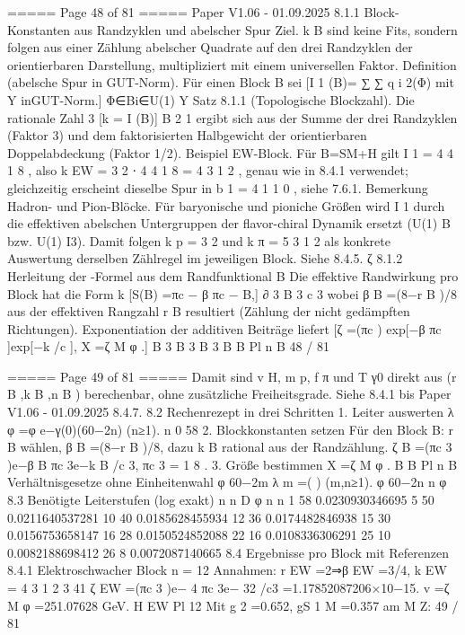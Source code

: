 \begin{MyVerbatim}
{===== Page 48 of 81 =====
Paper V1.06 - 01.09.2025
8.1.1 Block-Konstanten aus Randzyklen und abelscher Spur
Ziel. k B sind keine Fits, sondern folgen aus einer Zählung abelscher Quadrate auf den drei Randzyklen der
orientierbaren Darstellung, multipliziert mit einem universellen Faktor.
Definition (abelsche Spur in GUT-Norm). Für einen Block B sei
[I
1
(B)= ∑ ∑ q
i
2(Φ) mit Y inGUT-Norm.]
Φ∈Bi∈U(1)
Y
Satz 8.1.1 (Topologische Blockzahl). Die rationale Zahl
3
[k = I (B)]
B 2 1
ergibt sich aus der Summe der drei Randzyklen (Faktor 3) und dem faktorisierten Halbgewicht der orientierbaren
Doppelabdeckung (Faktor 1/2).
Beispiel EW-Block. Für B=SM+H gilt I 1 = 4 4 1 8 , also k EW = 3 2 ⋅ 4 4 1 8 = 4 3 1 2 , genau wie in 8.4.1 verwendet; gleichzeitig
erscheint dieselbe Spur in b 1 = 4 1 1 0 , siehe 7.6.1.
Bemerkung Hadron- und Pion-Blöcke. Für baryonische und pioniche Größen wird I 1 durch die effektiven abelschen
Untergruppen der flavor-chiral Dynamik ersetzt (U(1) B bzw. U(1) I3). Damit folgen k p = 3 2 und k π = 5 3 1 2 als konkrete
Auswertung derselben Zählregel im jeweiligen Block. Siehe 8.4.5.
ζ
8.1.2 Herleitung der -Formel aus dem Randfunktional
B
Die effektive Randwirkung pro Block hat die Form
k
[S(B) =πc − β πc − B,]
∂ 3 B 3 c
3
wobei β B =(8−r B )/8 aus der effektiven Rangzahl r B resultiert (Zählung der nicht gedämpften Richtungen).
Exponentiation der additiven Beiträge liefert
[ζ =(πc ) exp[−β πc ]exp[−k /c ], X =ζ M φ .]
B 3 B 3 B 3 B B Pl n
B
48 / 81

===== Page 49 of 81 =====
Damit sind v H, m p, f π und T γ0 direkt aus (r B ,k B ,n B ) berechenbar, ohne zusätzliche Freiheitsgrade. Siehe 8.4.1 bis
Paper V1.06 - 01.09.2025
8.4.7.
8.2 Rechenrezept in drei Schritten
1. Leiter auswerten
λ
φ =φ e−γ(0)(60−2n) (n≥1).
n 0 58
2. Blockkonstanten setzen
Für den Block B: r B wählen, β B =(8−r B )/8, dazu k B rational aus der Randzählung.
ζ B =(πc 3 )e−β B πc 3e−k B /c 3, πc 3 = 1 8 .
3. Größe bestimmen
X =ζ M φ .
B B Pl n
B
Verhältnisgesetze ohne Einheitenwahl
φ 60−2m λ
m =( ) (m,n≥1).
φ 60−2n
n
φ
8.3 Benötigte Leiterstufen (log exakt)
n
n D φ
n n
1 58 0.0230930346695
5 50 0.0211640537281
10 40 0.0185628455934
12 36 0.0174482846938
15 30 0.0156753658147
16 28 0.0150524852088
22 16 0.0108336306291
25 10 0.0082188698412
26 8 0.0072087140665
8.4 Ergebnisse pro Block mit Referenzen
8.4.1 Elektroschwacher Block n = 12
Annahmen: r EW =2⇒β EW =3/4, k EW = 4 3 1 2
3 41
ζ
EW
=(πc
3
)e− 4 πc 3e− 32 /c3 =1.17852087206×10−15.
v =ζ M φ =251.07628 GeV.
H EW Pl 12
Mit g 2 =0.652, gS 1 M =0.357 am M Z:
49 / 81

}
\end{MyVerbatim}
